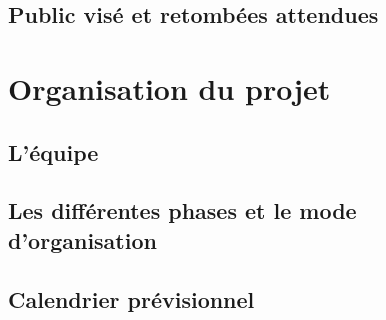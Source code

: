 \documentclass{article}
\begin{document}
\subsection{Public visé et retombées attendues}

\section{Organisation du projet}

\subsection{L'équipe}

\subsection{Les différentes phases et le mode d'organisation}

\subsection{Calendrier prévisionnel}
\end{document}
